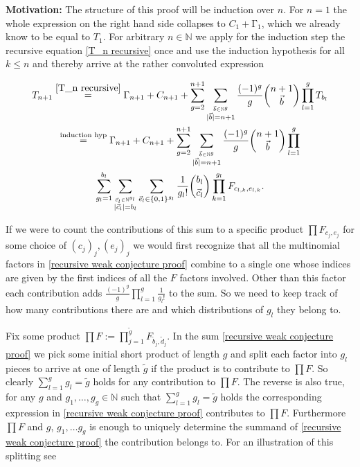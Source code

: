 \documentclass[b5paper,draft,openbib,12pt]{memoir}
\begin{document}
\textbf{Motivation:} The structure of this proof will be induction over \(n\). For \(n=1\) the whole expression
on the right hand side collapses to \(C_1 + \mathrm\Gamma_1\), which we already know to be equal to \(T_1\). For
arbitrary \(n\in\mathbb{N}\) we apply for the induction step 
the recursive equation \eqref{T_n recursive}
once and use the induction hypothesis for all \(k\le n\) and thereby arrive at the rather convoluted 
expression

\begin{multline}\label{recursive weak conjecture proof}
T_{n+1} \stackrel{\eqref{T_n recursive}}{=} 
\mathrm\Gamma_{n+1} + C_{n+1}+ \sum_{g=2}^{n+1} \sum_{\stackrel{\vec{b}\in\mathbb{N}^g}{|\vec{b}|=n+1}} 
\frac{(-1)^g}{g} \binom{n+1}{\vec{b}} \prod_{l=1}^g T_{b_l}\\
\stackrel{\text{induction hyp}}{=} \mathrm\Gamma_{n+1} + C_{n+1}+ \sum_{g=2}^{n+1} \sum_{\stackrel{\vec{b}\in\mathbb{N}^g}{|\vec{b}|=n+1}} 
\frac{(-1)^g}{g} \binom{n+1}{\vec{b}} \prod_{l=1}^g \\
\sum_{g_l=1}^{b_l} \sum_{\stackrel{\vec{c}_l \in\mathbb{N}^{g_l}}{|\vec{c}_l|=b_l}} \sum_{\vec{e}_l \in \{0,1\}^{g_l}}
\frac{1}{g_l!} \binom{b_l}{\vec{c}_l} \prod_{k=1}^{g_l} F_{c_{l,k},e_{l,k}}.
\end{multline}

If we were to count the contributions of this sum to a specific product \(\prod F_{c_j,e_j}\) for some choice of 
\((c_j)_j, (e_j)_j\) we would first recognize that all the multinomial factors in \eqref{recursive weak conjecture proof}
combine to a single one whose indices are given by the first indices of all the \(F\) factors involved.
Other than this factor each contribution adds \(\frac{(-1)^g}{g} \prod_{l=1}^g \frac{1}{g_l!}\) to the sum. So we 
need to keep track of how many contributions there are and which distributions of \(g_l\) they belong to. 

Fix some product \(\prod F :=\prod_{j=1}^{\tilde{g}} F_{\tilde{b}_j,\tilde{d}_j}\). In the sum 
\eqref{recursive weak conjecture proof} we pick some initial short product of length \(g\) and split each
factor into \(g_l\) pieces to arrive at one of length \(\tilde{g}\) if the product is to contribute to
\(\prod F\). So clearly \(\sum_{l=1}^g g_l = \tilde{g}\) holds for any contribution to \(\prod F\). 
The reverse is also true, for any
\(g\) and \(g_1, \dots, g_g\in\mathbb{N}\) such that \(\sum_{l=1}^g g_l=\tilde{g}\) holds
the corresponding expression in \eqref{recursive weak conjecture proof} contributes to 
\(\prod F\). Furthermore \(\prod F\) and \(g\), \(g_1,\dots g_g\) is enough to uniquely
determine the summand of \eqref{recursive weak conjecture proof} the contribution
belongs to. For an illustration of this splitting see
\end{document}
